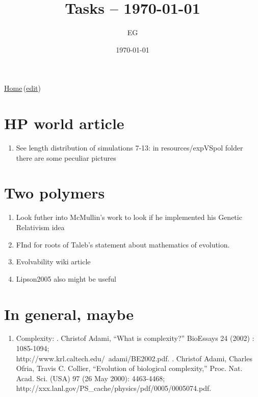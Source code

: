 \documentclass[12pt]{paper}
\title{Tasks  -- \today}
\author{EG}
\date{\today}
\newcommand{\wikilink}[2] { \href{#1.pdf}{#2}\,(\href{#1.tex}{edit})}
\begin{document}
 \maketitle
\wikilink{home}{Home}

\section{HP world article}
\begin{enumerate}
 \item See length distribution of simulations 7-13: in resources/expVSpol folder there are some 
peculiar pictures
\end{enumerate}

\section{Two polymers}
\begin{enumerate}
 \item Look futher into McMullin's work to look if he implemented his Genetic Relativism idea
 \item FInd for roots of Taleb's statement about mathematics of evolution.
 \item Evolvability wiki article
 \item Lipson2005 also might be useful
\end{enumerate}

\section{In general, maybe}
\begin{enumerate}
\item Complexity:
. Christof Adami, ``What is complexity?''
BioEssays 24 (2002) : 1085-1094; \\
http://www.krl.caltech.edu/~adami/BE2002.pdf.
. Christof Adami, Charles Ofria, Travis C. Collier, “Evolution of biological
complexity,” Proc. Nat. Acad. Sci. (USA) 97 (26 May 2000): 4463-4468; \\
http://xxx.lanl.gov/PS\_cache/physics/pdf/0005/0005074.pdf.
\end{enumerate}
\end{document}
